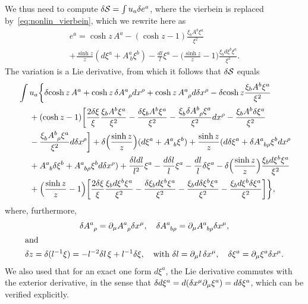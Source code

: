 \documentclass[
final,
11pt,
a4paper,
DIV=11,
headinclude=true,
footinclude=false,
bibliography=totoc,
twoside=true,  %
BCOR=5mm
]{scrbook}
\begin{document}
\begin{subappendices}
We thus need to compute $\delta \mathcal{S} = \int u_a \delta e^a$, 
where the vierbein is replaced by~\eqref{eq:nonlin_vierbein}, 
which we rewrite here as
\begin{multline*}
  e^a = \cosh z\, A^a - (\cosh z -1) \frac{\xi_b A^b 
    \xi^a}{\xi^2} \\
  + \frac{\sinh z}{z}(d\xi^a + A^a_{~b}\xi^b) - \frac{dl}{l} 
  \xi^a - \bigg( \frac{\sinh z}{z} - 1 \bigg) \frac{\xi_b d\xi^b 
    \xi^a}{\xi^2}.
\end{multline*}
The variation is a Lie derivative, from which it follows that 
$\delta \mathcal{S}$ equals
\begin{align*}
  &\int u_a \bigg\{ \delta\!\cosh z\, A^a + \cosh z\, \delta 
  A\ind{^a_\rho} dx^\rho + \cosh z\, A\ind{^a_\rho} d\delta 
  x^\rho - \delta\!\cosh z \frac{\xi_b A^b \xi^a}{\xi^2}
  \\
  &\nla{} + (\cosh z - 1) \bigg[ \frac{2\delta\xi}{\xi} 
  \frac{\xi_b A^b \xi^a}{\xi^2} - \frac{\delta\xi_b A^b 
    \xi^a}{\xi^2} -\frac{\xi\ind{_b} \delta A\ind{^b_\rho} 
    \xi^a}{\xi^2} dx^\rho - \frac{\xi_b A^b \delta\xi^a}{\xi^2} 
  \\
  &\nla{} - \frac{\xi\ind{_b} A\ind{^b_\rho} \xi^a}{\xi^2} 
  d\delta x^\rho \bigg] + \delta \Big( \frac{\sinh z}{z} \Big) 
  ( d\xi^a + A\ind{^a_b}\xi^b )
  + \frac{\sinh z}{z} (d\delta \xi^a + \delta A\ind{^a_{b\rho}} 
  \xi^b dx^\rho
  \\
  &\nla{} + A\ind{^a_b} \delta\xi^b + A\ind{^a_{b\rho}} \xi^b 
  d\delta x^\rho) + \frac{\delta l dl}{l^2} \xi^a - \frac{d\delta 
    l}{l} \xi^a - \frac{dl}{l}\delta\xi^a - \delta \Big( 
  \frac{\sinh z}{z} \Big) \frac{\xi_b d\xi^b \xi^a}{\xi^2}
  \\
  &\nla{} + \Big( \frac{\sinh z}{z} -1 \Big) \bigg[ 
  \frac{2\delta\xi}{\xi} \frac{\xi_b d\xi^b \xi^a}{\xi^2} 
  - \frac{\delta\xi_b d\xi^b \xi^a}{\xi^2} - \frac{\xi_b d\delta 
    \xi^b \xi^a}{\xi^2} - \frac{\xi_b d\xi^b \delta\xi^a}{\xi^2} 
  \bigg]\bigg\},
\end{align*}
where, furthermore,
\begin{gather*}
  \delta A\ind{^a_\rho} = \pd_\mu A\ind{^a_\rho} \delta x^\mu,
  \quad
  \delta A\ind{^a_{b\rho}} = \pd_\mu A\ind{^a_{b\rho}} \delta 
  x^\mu,\\
\shortintertext{and}
  \delta z = \delta(l^{-1} \xi)= -l^{-2} \delta l\, \xi + l^{-1}
    \delta \xi,\quad
  \text{with~}
  \delta l = \pd_\mu l\, \delta x^\mu, \quad
  \delta \xi^a = \pd_\mu \xi^a \delta x^\mu.
\end{gather*}
We also used that for an exact one form $d\xi^a$, the Lie 
derivative commutes with the exterior derivative, in the sense 
that $\delta d\xi^a = d(\delta x^\mu \partial_\mu \xi^a) = d \delta 
\xi^a$, which can be verified explicitly.


\end{subappendices}
\end{document}
